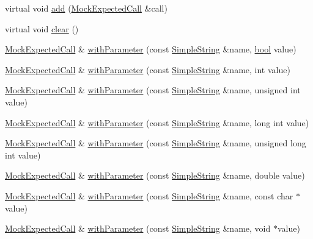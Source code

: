 \begin{DoxyCompactItemize}
virtual void \hyperlink{class_mock_expected_call_composite_a70b75001fa60ad73b211aa7866c14554}{add} (\hyperlink{class_mock_expected_call}{Mock\+Expected\+Call} \&call)
\item 
virtual void \hyperlink{class_mock_expected_call_composite_ac8bb3912a3ce86b15842e79d0b421204}{clear} ()
\item 
\hyperlink{class_mock_expected_call}{Mock\+Expected\+Call} \& \hyperlink{class_mock_expected_call_a9d735dfb585c1351650fcfad40f138bc}{with\+Parameter} (const \hyperlink{class_simple_string}{Simple\+String} \&name, \hyperlink{avb__gptp_8h_af6a258d8f3ee5206d682d799316314b1}{bool} value)
\item 
\hyperlink{class_mock_expected_call}{Mock\+Expected\+Call} \& \hyperlink{class_mock_expected_call_a8f249d5f2a770017be7a146ad4c28022}{with\+Parameter} (const \hyperlink{class_simple_string}{Simple\+String} \&name, int value)
\item 
\hyperlink{class_mock_expected_call}{Mock\+Expected\+Call} \& \hyperlink{class_mock_expected_call_a342cb778380da454c56e240fae0186be}{with\+Parameter} (const \hyperlink{class_simple_string}{Simple\+String} \&name, unsigned int value)
\item 
\hyperlink{class_mock_expected_call}{Mock\+Expected\+Call} \& \hyperlink{class_mock_expected_call_a0c84c6e3e39eef70254a71e4b7e275f8}{with\+Parameter} (const \hyperlink{class_simple_string}{Simple\+String} \&name, long int value)
\item 
\hyperlink{class_mock_expected_call}{Mock\+Expected\+Call} \& \hyperlink{class_mock_expected_call_adf4fe75932c7d2ce5f6ca5b4a8bece96}{with\+Parameter} (const \hyperlink{class_simple_string}{Simple\+String} \&name, unsigned long int value)
\item 
\hyperlink{class_mock_expected_call}{Mock\+Expected\+Call} \& \hyperlink{class_mock_expected_call_ab554906346659e0f70f7764ed1fd3f28}{with\+Parameter} (const \hyperlink{class_simple_string}{Simple\+String} \&name, double value)
\item 
\hyperlink{class_mock_expected_call}{Mock\+Expected\+Call} \& \hyperlink{class_mock_expected_call_ac5f6920554d1ecc0a9bbf417d5c69375}{with\+Parameter} (const \hyperlink{class_simple_string}{Simple\+String} \&name, const char $\ast$value)
\item 
\hyperlink{class_mock_expected_call}{Mock\+Expected\+Call} \& \hyperlink{class_mock_expected_call_abb0ab5ac7408454bb144beaa438030ac}{with\+Parameter} (const \hyperlink{class_simple_string}{Simple\+String} \&name, void $\ast$value)
\item 

\end{DoxyCompactItemize}
